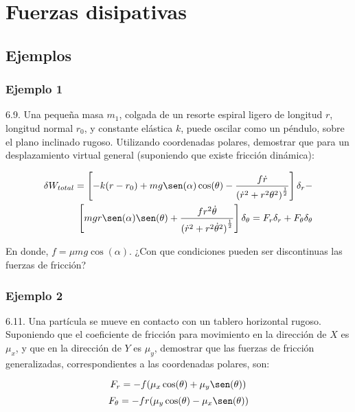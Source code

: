 \chapter{Fuerzas disipativas}

\section{Ejemplos}

\subsection{Ejemplo 1}
6.9. Una pequeña masa $m_1$, colgada de un resorte espiral ligero de longitud
$r$, longitud normal $r_0$, y constante elástica $k$, puede oscilar como un
péndulo, sobre el plano inclinado rugoso. Utilizando coordenadas polares,
demostrar que para un desplazamiento virtual general (suponiendo que existe
fricción dinámica):

\begin{equation*}
\begin{split}
    \delta W_{total}=\left[
        -k(r-r_0)+
        mg\sen(\alpha)\cos(\theta)-
        \frac{f\dot{r}}{{(\dot{r}^2+r^2{\theta}^2)}^{\frac{1}{2}}}
    \right]\delta_r-\\
    \left[
        mgr\sen(\alpha)\sen(\theta)+
        \frac{fr^2\dot{\theta}}{{(\dot{r}^2+r^2\dot{\theta}^2)}^{\frac{1}{2}}}
    \right]\delta_{\theta}=F_r\delta_r+F_{\theta}\delta_{\theta}
\end{split}
\end{equation*}

En donde, $f=\mu mg\cos(\alpha)$. ¿Con que condiciones pueden ser discontinuas
las fuerzas de fricción?

\subsection{Ejemplo 2}
6.11. Una partícula se mueve en contacto con un tablero horizontal rugoso.
Suponiendo que el coeficiente de fricción para movimiento en la dirección de $X$
es $\mu_x$, y que en la dirección de $Y$ es $\mu_y$, demostrar que las fuerzas
de fricción generalizadas, correspondientes a las coordenadas polares, son:

\begin{equation*}
    F_r=-f(\mu_x\cos(\theta)+\mu_y\sen(\theta))
\end{equation*}
\begin{equation*}
    F_{\theta}=-fr(\mu_y\cos(\theta)-\mu_x\sen(\theta))
\end{equation*}

